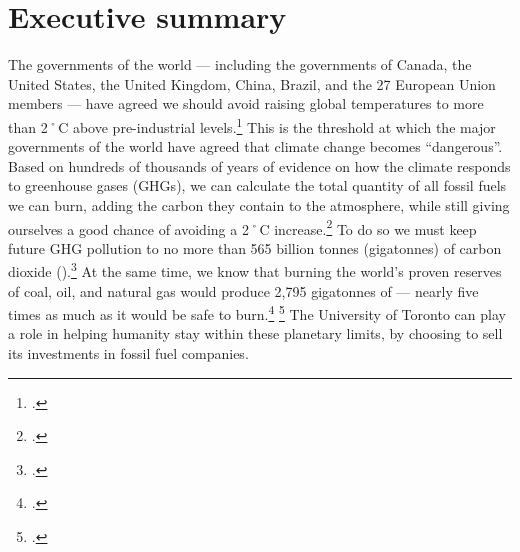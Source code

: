 

		\singlespacing
		\section{Executive summary}
		\label{sec:ExecutiveSummary}
		\doublespacing






The governments of the world --- including the governments of Canada, the United States, the United Kingdom, China, Brazil, and the 27 European Union members --- have agreed we should avoid raising global temperatures to more than 2˚C above pre-industrial levels.\footcite[][]{CopenhagenAccord}
This is the threshold at which the major governments of the world have agreed that climate change becomes ``dangerous''.
Based on hundreds of thousands of years of evidence on how the climate responds to greenhouse gases (GHGs), we can calculate the total quantity of all fossil fuels we can burn, adding the carbon they contain to the atmosphere, while still giving ourselves a good chance of avoiding a 2˚C increase.\footcite[Research published in \emph{Nature} highlights how even a limit of 2˚C of warming ``is not sufficient to control many other quantities, such as transient sea level rise, ocean acidification and net primary production on land''. Limiting warming to a lesser level would require even more aggressive action than described in this brief.][p. 197]{Steinacher2013}
To do so we must keep future GHG pollution to no more than 565 billion tonnes (gigatonnes) of carbon dioxide ().\footcite[For a more detailed explanation that is accessible to non-experts see: ][]{TerrifyingNewMath}
At the same time, we know that burning the world's proven reserves of coal, oil, and natural gas would produce 2,795 gigatonnes of  --- nearly five times as much as it would be safe to burn.\footcite[][]{CTI2012} \footcite[Another accessible summary of the issue can be found in this free hour-long radio program: ][]{HotBackyard}
The University of Toronto can play a role in helping humanity stay within these planetary limits, by choosing to sell its investments in fossil fuel companies.



